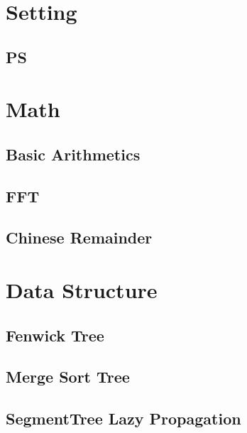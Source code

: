 \documentclass[10pt,landscape,a4paper,twocolumn]{article}
\begin{document}
\tableofcontents


\section{Setting}
\subsection{PS}





\section{Math}
\subsection{Basic Arithmetics}






\subsection{FFT}


\subsection{Chinese Remainder}




\section{Data Structure}
\subsection{Fenwick Tree}


\subsection{Merge Sort Tree}


\subsection{SegmentTree Lazy Propagation}

\end{document}
